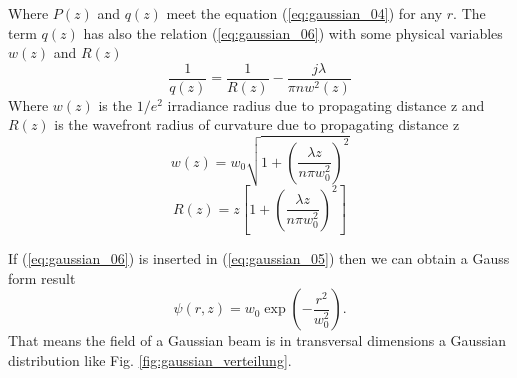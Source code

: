 Where $P(z)$ and $q(z)$ meet the equation (\ref{eq:gaussian_04}) for any $r$. The term $q(z)$ has also the relation (\ref{eq:gaussian_06}) with some physical variables $w(z)$ and $R(z)$
\begin{equation}
\frac{1}{q(z)}=\frac{1}{R(z)}-\frac{j\lambda}{\pi nw^{2}(z)}
\label{eq:gaussian_06}
\end{equation}
Where $w(z)$ is the $1/e^2$ irradiance radius due to propagating distance z and $R(z)$ is the wavefront radius of curvature due to propagating distance z
\begin{equation}
w(z)=w_{0}\sqrt{1+\left(\frac{\lambda z}{n\pi w^{2}_{0}}\right)^{2}}
\label{eq:gaussian_07}
\end{equation}
\begin{equation}
R(z)=z\left[1+\left(\frac{\lambda z}{n\pi w^{2}_{0}}\right)^{2}\right]
\label{eq:gaussian_08}
\end{equation}

If (\ref{eq:gaussian_06}) is inserted in (\ref{eq:gaussian_05}) then we can obtain a Gauss form result 
\begin{equation*}
\psi(r,z)=w_{0}\exp\left(-\frac{r^2}{w^2_{0}}\right) \text{.}
\label{eq:gaussian_09}
\end{equation*}
That means the field of a Gaussian beam is in transversal dimensions a Gaussian distribution like Fig. \ref{fig:gaussian_verteilung}.\\


